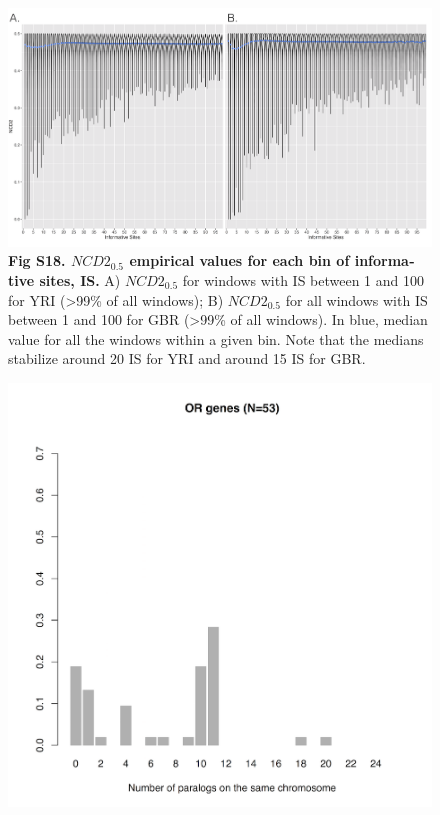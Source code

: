 \begin{refsection}
\begin{otherlanguage}{english}
\begin{figure}
\centering
\includegraphics[]{chap2_folder/supp_figures/S18_Fig.png}
\caption*{\textbf{Fig S18. $NCD2_{0.5}$ empirical values for each bin of informative sites, IS.}
A) $NCD2_{0.5}$ for windows with IS between 1 and 100 for YRI (>99\% of all windows); B) $NCD2_{0.5}$ for all windows with IS between 1 and 100 for GBR (>99\% of all windows). In blue, median value for all the windows within a given bin. Note that the medians stabilize around 20 IS for YRI and around 15 IS for GBR.
}
\end{figure}
%
%
\begin{figure}[!htb]
\includegraphics[]{chap2_folder/supp_figures/S19_fig.png}

\end{figure}
\end{otherlanguage}
\end{refsection}
